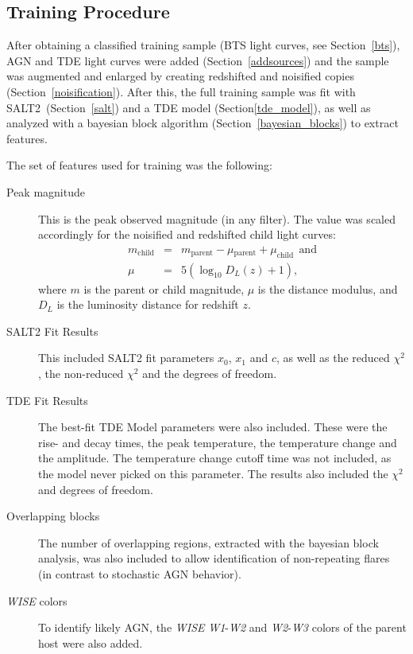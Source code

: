 \subsection{Training Procedure}
After obtaining a classified training sample (BTS light curves, see Section~\ref{bts}), AGN and TDE light curves were added (Section~\ref{addsources}) and the sample was augmented and enlarged by creating redshifted and noisified copies (Section~\ref{noisification}). After this, the full training sample was fit with SALT2~(Section~\ref{salt}) and a TDE model (Section\ref{tde_model}), as well as analyzed with a bayesian block algorithm (Section~\ref{bayesian_blocks}) to extract features.

The set of features used for training was the following:

\begin{description}
  \item[Peak magnitude] This is the peak observed magnitude (in any filter). The value was scaled accordingly for the noisified and redshifted child light curves:
    \begin{subequations}
      \begin{eqnarray}
        m_\text{child} &=& m_\text{parent} - \mu­_\text{parent} + \mu_\text{child}~~\text{and}\\
        \mu &=& 5(\log_{10}D_L(z)+1),
      \end{eqnarray}
    \end{subequations}
    where $m$ is the parent or child magnitude, $\mu$ is the distance modulus, and $D_L$ is the luminosity distance for redshift $z$.
  \item[SALT2 Fit Results] This included SALT2 fit parameters $x_0$, $x_1$ and $c$, as well as the reduced $\chi^2$, the non-reduced $\chi^2$ and the degrees of freedom.
  \item[TDE Fit Results] The best-fit TDE Model parameters were also included. These were the rise- and decay times, the peak temperature, the temperature change and the amplitude. The temperature change cutoff time was not included, as the model never picked on this parameter. The results also included the $\chi^2$ and degrees of freedom.
  \item[Overlapping blocks] The number of overlapping regions, extracted with the bayesian block analysis, was also included to allow identification of non-repeating flares (in contrast to stochastic AGN behavior).
  \item[\textit{WISE} colors] To identify likely AGN, the \textit{WISE} \textit{W1}-\textit{W2} and \textit{W2}-\textit{W3} colors of the parent host were also added.

\end{description}
